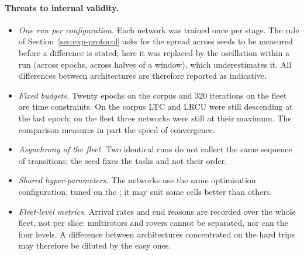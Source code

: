 \paragraph{Threats to internal validity.}
\begin{itemize}
  \item \emph{One run per configuration.} Each network was trained once per
        stage. The rule of Section~\ref{sec:exp-protocol} asks for the spread
        across seeds to be measured before a difference is stated; here it was
        replaced by the oscillation within a run (across epochs, across halves of
        a window), which underestimates it. All differences between
        architectures are therefore reported as indicative.
  \item \emph{Fixed budgets.} Twenty epochs on the corpus and \num{320}
        iterations on the fleet are time constraints. On the corpus LTC and LRCU
        were still descending at the last epoch; on the fleet three networks were
        still at their maximum. The comparison measures in part the speed of
        convergence.
  \item \emph{Asynchrony of the fleet.} Two identical runs do not collect the
        same sequence of transitions; the seed fixes the tasks and not their
        order.
  \item \emph{Shared hyper-parameters.} The networks use the same optimisation
        configuration, tuned on the ; it may suit some
        cells better than others.
  \item \emph{Fleet-level metrics.} Arrival rates and end reasons are recorded
        over the whole fleet, not per slice: multirotors and rovers cannot be
        separated, nor can the four levels. A difference between architectures
        concentrated on the hard trips may therefore be diluted by the easy
        ones.
\end{itemize}

